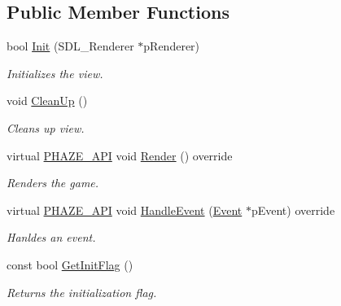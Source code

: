 \subsection*{Public Member Functions}
\begin{DoxyCompactItemize}
\item 
bool \mbox{\hyperlink{class_view_a721fe641411d670c3679ee6e188c0084}{Init}} (S\+D\+L\+\_\+\+Renderer $\ast$p\+Renderer)
\begin{DoxyCompactList}\small\item\em Initializes the view. \end{DoxyCompactList}\item 
\mbox{\label{class_view_a50f75e10ba08bf35196cd71c0b883331}} 
void \mbox{\hyperlink{class_view_a50f75e10ba08bf35196cd71c0b883331}{Clean\+Up}} ()
\begin{DoxyCompactList}\small\item\em Cleans up view. \end{DoxyCompactList}\item 
\mbox{\label{class_view_acc8397285a5d338f862e6864602e2d87}} 
virtual \mbox{\hyperlink{_macros_8h_a9ce0e6835f82908079752fa4ebe70dc9}{P\+H\+A\+Z\+E\+\_\+\+A\+PI}} void \mbox{\hyperlink{class_view_acc8397285a5d338f862e6864602e2d87}{Render}} () override
\begin{DoxyCompactList}\small\item\em Renders the game. \end{DoxyCompactList}\item 
\mbox{\label{class_view_abaeae948fb2fbc2585756afc6962b66e}} 
virtual \mbox{\hyperlink{_macros_8h_a9ce0e6835f82908079752fa4ebe70dc9}{P\+H\+A\+Z\+E\+\_\+\+A\+PI}} void \mbox{\hyperlink{class_view_abaeae948fb2fbc2585756afc6962b66e}{Handle\+Event}} (\mbox{\hyperlink{struct_event}{Event}} $\ast$p\+Event) override
\begin{DoxyCompactList}\small\item\em Hanldes an event. \end{DoxyCompactList}\item 
const bool \mbox{\hyperlink{class_view_a899a25e7a81c52ab1ce48ce7675f06df}{Get\+Init\+Flag}} ()
\begin{DoxyCompactList}\small\item\em Returns the initialization flag. \end{DoxyCompactList}\end{DoxyCompactItemize}


